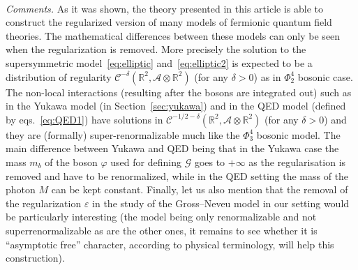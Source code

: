 \documentclass{article}
\newcommand{\tmtextit}[1]{{\itshape{#1}}}
\begin{document}
\

\tmtextit{Comments.} As it was shown, the theory presented in this article is
able to construct the regularized version of many models of fermionic quantum
field theories. The mathematical differences between these models can only be
seen when the regularization is removed. More precisely the solution to the
supersymmetric model~{\eqref{eq:elliptic}} and~{\eqref{eq:elliptic2}} is
expected to be a distribution of regularity $\mathcal{C}^{- \delta}
(\mathbb{R}^2, \mathcal{A} \otimes \mathbb{R}^2)$ (for any $\delta > 0$) as in
$\Phi^4_2$ bosonic case. The non-local interactions (resulting after the
bosons are integrated out) such as in the Yukawa model (in
Section~\ref{sec:yukawa}) and in the QED model (defined by
eqs.~{\eqref{eq:QED1}}) have solutions in $\mathcal{C}^{- 1 / 2 - \delta}
(\mathbb{R}^2, \mathcal{A} \otimes \mathbb{R}^2)$ (for any $\delta > 0$) and
they are (formally) super-renormalizable much like the $\Phi^4_3$ bosonic
model. The main difference between Yukawa and QED being that in the Yukawa
case the mass $m_b$ of the boson $\varphi$ used for defining $\mathcal{G}$
goes to $+ \infty$ as the regularisation is removed and have to be
renormalized, while in the QED setting the mass of the photon $M$ can be kept
constant. Finally, let us also mention that the removal of the regularization
$\varepsilon$ in the study of the Gross--Neveu model in our setting would be
particularly interesting (the model being only renormalizable and not
superrenormalizable as are the other ones, it remains to see whether it is
``asymptotic free'' character, according to physical terminology, will help
this construction).
\end{document}
